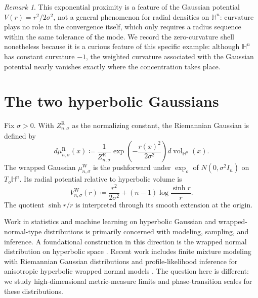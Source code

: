 \documentclass{amsart}
\numberwithin{equation}{section}
\theoremstyle{plain}
\theoremstyle{definition}
\theoremstyle{remark}
\newtheorem{rem}[thm]{Remark}
\newcommand{\Hyp}{\mathbb{H}}
\begin{document}
\begin{rem}
	This exponential proximity is a feature of the Gaussian potential
	$V(r)=r^2/2\sigma^2$, not a general phenomenon for radial densities on
	$\mathbb H^n$: curvature plays no role in the convergence itself, which
	only requires a radius sequence within the same tolerance of the mode.
	We record the zero-curvature shell nonetheless because it is a curious
	feature of this specific example: although $\mathbb H^n$ has constant
	curvature $-1$, the weighted curvature associated with the Gaussian
	potential nearly vanishes exactly where the concentration takes place.
\end{rem}

\section{The two hyperbolic Gaussians}\label{sec:gaussians}

Fix $\sigma>0$.  With $Z^{\mathrm R}_{n,\sigma}$ as the normalizing constant,
the Riemannian Gaussian is defined by
\begin{equation}\label{eq:riemannian-gaussian}
	d\mu^{\mathrm R}_{n,\sigma}(x)
	\coloneqq
	\frac1{Z^{\mathrm R}_{n,\sigma}}
	\exp\left(-\frac{r(x)^2}{2\sigma^2}\right)
	d\operatorname{vol}_{\Hyp^n}(x).
\end{equation}
The wrapped Gaussian $\mu^{\mathrm W}_{n,\sigma}$ is the pushforward under
$\exp_o$ of
$N(0,\sigma^2I_n)$ on $T_o\Hyp^n$.  Its radial potential relative to
hyperbolic volume is
\begin{equation}\label{eq:wrapped-potential}
	V^{\mathrm W}_{n,\sigma}(r)
	\coloneqq
	\frac{r^2}{2\sigma^2}
	+(n-1)\log\frac{\sinh r}{r}.
\end{equation}
The quotient $\sinh r/r$ is interpreted through its smooth extension at the
origin.

Work in statistics and machine learning on hyperbolic Gaussian and
wrapped-normal-type distributions is primarily concerned with modeling,
sampling, and inference.  A foundational construction in this direction is the
wrapped normal distribution on hyperbolic space
\cite{nagano2019wrapped}.  Recent work includes finite mixture modeling with
Riemannian Gaussian distributions and profile-likelihood inference for
anisotropic hyperbolic wrapped normal models
\cite{you2026mixture,you2026profile}.  The question here is different: we
study high-dimensional metric-measure limits and phase-transition scales for
these distributions.
\end{document}
